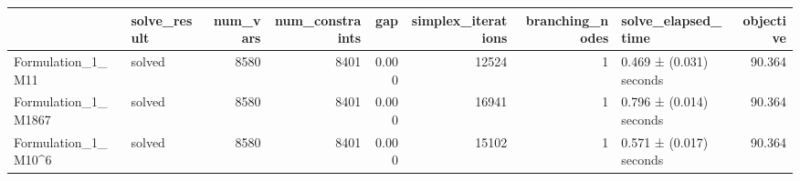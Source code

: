 \begin{tabular}{llrrrrrlr}
\toprule
 & solve_result & num_vars & num_constraints & gap & simplex_iterations & branching_nodes & solve_elapsed_time & objective \\
\midrule
Formulation_1_M11 & solved & 8580 & 8401 & 0.000 & 12524 & 1 & 0.469 ± (0.031) seconds & 90.364 \\
Formulation_1_M1867 & solved & 8580 & 8401 & 0.000 & 16941 & 1 & 0.796 ± (0.014) seconds & 90.364 \\
Formulation_1_M10^6 & solved & 8580 & 8401 & 0.000 & 15102 & 1 & 0.571 ± (0.017) seconds & 90.364 \\
\bottomrule
\end{tabular}
